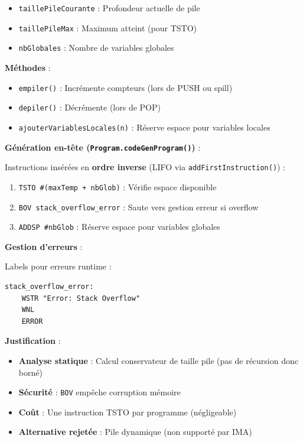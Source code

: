 \documentclass[12pt,a4paper]{article}
\begin{document}
\begin{itemize}[itemsep=0.2em]
    \item \texttt{taillePileCourante} : Profondeur actuelle de pile
    \item \texttt{taillePileMax} : Maximum atteint (pour TSTO)
    \item \texttt{nbGlobales} : Nombre de variables globales
\end{itemize}

\textbf{Méthodes} :

\begin{itemize}[itemsep=0.2em]
    \item \texttt{empiler()} : Incrémente compteurs (lors de PUSH ou spill)
    \item \texttt{depiler()} : Décrémente (lors de POP)
    \item \texttt{ajouterVariablesLocales(n)} : Réserve espace pour variables locales
\end{itemize}

\textbf{Génération en-tête (\texttt{Program.codeGenProgram()})} :

Instructions insérées en \textbf{ordre inverse} (LIFO via \texttt{addFirstInstruction()}) :

\begin{enumerate}[itemsep=0.2em]
    \item \texttt{TSTO \#(maxTemp + nbGlob)} : Vérifie espace disponible
    \item \texttt{BOV stack\_overflow\_error} : Saute vers gestion erreur si overflow
    \item \texttt{ADDSP \#nbGlob} : Réserve espace pour variables globales
\end{enumerate}

\textbf{Gestion d'erreurs} :

Labels pour erreurs runtime :

\begin{lstlisting}[style=bashstyle, numbers=none]
stack_overflow_error:
    WSTR "Error: Stack Overflow"
    WNL
    ERROR
\end{lstlisting}

\textbf{Justification} :

\begin{itemize}[itemsep=0.2em]
    \item \textbf{Analyse statique} : Calcul conservateur de taille pile (pas de récursion donc borné)
    \item \textbf{Sécurité} : \texttt{BOV} empêche corruption mémoire
    \item \textbf{Coût} : Une instruction TSTO par programme (négligeable)
    \item \textbf{Alternative rejetée} : Pile dynamique (non supporté par IMA)
\end{itemize}
\end{document}
